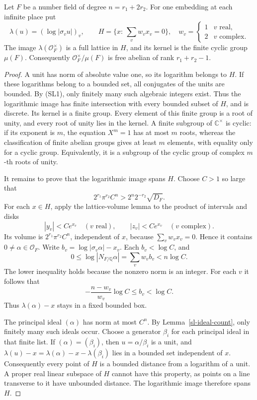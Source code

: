 \begin{theorem}\label{su-unit-theorem}
Let $F$ be a number field of degree $n=r_1+2r_2$.
For one embedding at each infinite place put
\[
 \lambda(u)=(\log|\sigma_vu|)_v,\qquad
 H=\{x:\ \sum_v w_vx_v=0\},
 \quad
 w_v=\begin{cases}1&v\text{ real},\\2&v\text{ complex}.\end{cases}
\]
The image $\lambda(\mathcal O_F^\times)$ is a full lattice
in $H$, and its kernel is the finite cyclic group $\mu(F)$.
Consequently $\mathcal O_F^\times/\mu(F)$ is free abelian
of rank $r_1+r_2-1$.
\end{theorem}
\begin{proof}
A unit has norm of absolute value one, so its logarithm
belongs to $H$.  If these logarithms belong to a bounded
set, all conjugates of the units are bounded.
By (SL1), only finitely many such algebraic integers
exist.  Thus the logarithmic image has finite intersection
with every bounded subset of $H$, and is discrete.
Its kernel is a finite group.  Every element of this
finite group is a root of unity, and every root of unity
lies in the kernel.  A finite subgroup of
$\mathbb C^\times$ is cyclic: if its exponent is $m$,
the equation $X^m=1$ has at most $m$ roots, whereas the
classification of finite abelian groups gives at least
$m$ elements, with equality only for a cyclic group.
Equivalently, it is a subgroup of the cyclic group of
complex $m$-th roots of unity.

It remains to prove that the logarithmic image spans $H$.
Choose $C>1$ so large that
\[
       2^{r_1}\pi^{r_2}C^n
                         >2^n2^{-r_2}\sqrt{D_F}.
\]
For each $x\in H$, apply the lattice-volume lemma to the
product of intervals and disks
\[
    |y_v|<Ce^{x_v}\quad(v\text{ real}),\qquad
    |z_v|<Ce^{x_v}\quad(v\text{ complex}).
\]
Its volume is $2^{r_1}\pi^{r_2}C^n$, independent of $x$,
because $\sum_vw_vx_v=0$.  Hence it contains
$0\ne\alpha\in\mathcal O_F$.
Write $b_v=\log|\sigma_v\alpha|-x_v$.
Each $b_v<\log C$, and
\[
          0\le\log|N_{F/\mathbb Q}\alpha|
                    =\sum_vw_vb_v<n\log C.
\]
The lower inequality holds because the nonzero norm is
an integer.  For each $v$ it follows that
\[
          -\frac{n-w_v}{w_v}\log C
                    \le b_v<\log C .
\]
Thus $\lambda(\alpha)-x$ stays in a fixed bounded box.

The principal ideal $(\alpha)$ has norm at most $C^n$.
By Lemma~\ref{sl-ideal-count}, only finitely many such
ideals occur.  Choose a generator $\beta_i$ for each
principal ideal in that finite list.  If
$(\alpha)=(\beta_i)$, then $u=\alpha/\beta_i$ is a unit,
and
$\lambda(u)-x=\lambda(\alpha)-x-\lambda(\beta_i)$
lies in a bounded set independent of $x$.
Consequently every point of $H$ is a bounded distance
from a logarithm of a unit.  A proper real linear
subspace of $H$ cannot have this property, as points
on a line transverse to it have unbounded distance.
The logarithmic image therefore spans $H$.


\end{proof}
